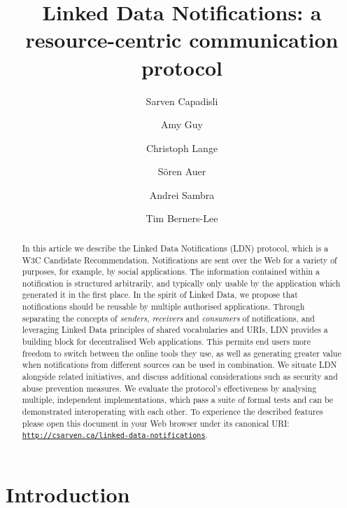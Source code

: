 \documentclass[a4paper]{llncs}
\begin{document}
\title{Linked Data Notifications: a resource-centric communication protocol}

\author{Sarven Capadisli
  \and Amy Guy
  \and Christoph Lange
  \and Sören Auer
  \and Andrei Sambra
  \and Tim Berners-Lee}
\maketitle

\begin{abstract}
  In this article we describe the Linked Data Notifications (LDN) protocol, which is a W3C Candidate Recommendation. Notifications are sent over the Web for a variety of purposes, for example, by social applications. The information contained within a notification is structured arbitrarily, and typically only usable by the application which generated it in the first place. In the spirit of Linked Data, we propose that notifications should be reusable by multiple authorised applications. Through separating the concepts of {\em senders}, {\em receivers} and {\em consumers} of notifications, and leveraging Linked Data principles of shared vocabularies and URIs, LDN provides a building block for decentralised Web applications. This permits end users more freedom to switch between the online tools they use, as well as generating greater value when notifications from different sources can be used in combination. We situate LDN alongside related initiatives, and discuss additional considerations such as security and abuse prevention measures. We evaluate the protocol’s effectiveness by analysing multiple, independent implementations, which pass a suite of formal tests and can be demonstrated interoperating with each other. To experience the described features please open this document in your Web browser under its canonical URI: {\tt \href{http://csarven.ca/linked-data-notifications}{http://csarven.ca/linked-data-notifications}}.
\end{abstract}

                        \section{Introduction}
  \label{introduction}
\end{document}
